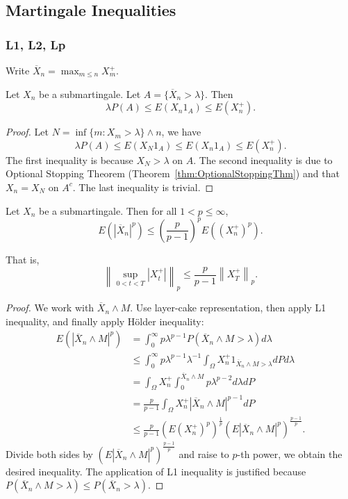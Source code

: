 \subsection{Martingale Inequalities}

\subsubsection{L1, L2, Lp}

Write $\overline{X} _n = \max_{m \le n} X_m^+$.
\begin{theorem}
	\label{thm:DooblInequality}
	Let $X_n$ be a submartingale. Let $A = \{\overline{X} _n > \lambda\} $. Then
	\[
		\lambda P(A) \le E\left( X_n 1_A \right) \le E(X_n^+)
	.\] 
\end{theorem}
\begin{proof}
	Let $N = \inf \{m: X_m > \lambda\} \wedge n$, we have
	\[
		\lambda P(A) \le E(X_N 1_A) \le E(X_n 1_A) \le E(X_n^+)
	.\] 
	The first inequality is because $X_N > \lambda$ on $A$. The second inequality is due to Optional Stopping Theorem (Theorem~\ref{thm:OptionalStoppingThm}) and that $X_n = X_N$ on $A^c$. The last inequality is trivial.
\end{proof}

\begin{theorem}
	\label{thm:DooblpMaximalInequality}
	Let $X_n$ be a submartingale. Then for all $1 < p \le \infty $,
	\[
		E\left( |\overline{X} _n|^p \right) 
		\le 
		\left( \frac{p}{p-1} \right)^p
		E\left( (X_n^+)^p \right) 
	.\] 

    That is,
    \[
\left\|\sup _{0<t<T}\left|X_t^{+}\right|\right\|_p \leq \frac{p}{p-1}\left\|X_T^{+}\right\|_p .
\]
\end{theorem}
\begin{proof}
	We work with $\overline{X} _n \wedge M$. Use layer-cake representation, then apply L1 inequality, and finally apply H\"older inequality:
	\begin{align*}
		E\left( |\overline{X} _n \wedge M|^p \right) 
		&= \int _0^\infty p \lambda^{p - 1} P\left(  \overline{X} _n \wedge M > \lambda \right) d \lambda  \\
		&\le  \int _0^\infty p \lambda^{p - 1} \lambda^{-1} \int _\Omega X_n^+ 1_{\overline{X} _n \wedge M > \lambda} dP d\lambda  \\
		&= \int _\Omega X_n^+ \int _0^{\overline{X} _n \wedge M}  p \lambda^{p - 2} d\lambda dP \\
		&= \frac{p}{p - 1} \int _\Omega X_n^+ |\overline{X} _n \wedge M|^{p - 1} dP \\
		&\leq \frac{p}{p - 1} (E (X_n^+)^p)^{\frac{1}{p}} (E|\overline{X} _n \wedge M|^{p})^{\frac{p - 1}{p}} 
	.\end{align*}
	Divide both sides by $(E|\overline{X} _n \wedge M|^{p})^{\frac{p - 1}{p}}$ and raise to $p$-th power, we obtain the desired inequality.
	The application of L1 inequality is justified because $P(\overline{X} _n \wedge M > \lambda) \le P (\overline{X} _n > \lambda)$.
\end{proof}


